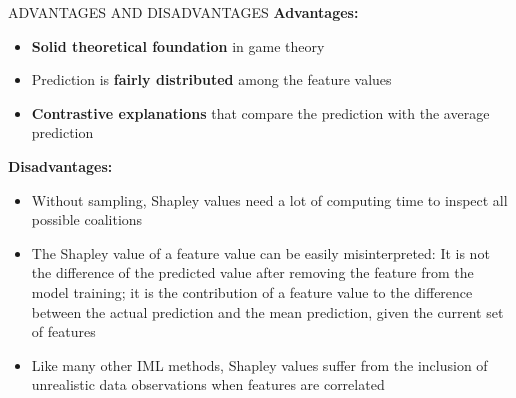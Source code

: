 \documentclass[11pt,compress,t,notes=noshow, aspectratio=169, xcolor=table]{beamer}
\begin{document}
\begin{frame}{ADVANTAGES AND DISADVANTAGES}
	\textbf{Advantages:}
	\begin{itemize}
	 \item \textbf{Solid theoretical foundation} in game theory
        \item Prediction is \textbf{fairly distributed} among the feature values
        \item \textbf{Contrastive explanations} that compare the prediction with the average prediction
	\end{itemize}
\vspace{0.25cm}
	\textbf{Disadvantages:}
	\begin{itemize}
		\item 	Without sampling, Shapley values need a lot of computing time to
		inspect all possible coalitions
		\item The Shapley value of a feature value can be easily misinterpreted:
		It is not the difference of the predicted value after removing the
		feature from the model training; it is the contribution of a feature
		value to the difference between the actual prediction and the mean
		prediction, given the current set of features
		\item Like many other IML methods, Shapley values suffer from the
		inclusion of unrealistic data observations when features are
		correlated
	\end{itemize}



\end{frame}

\endlecture
\end{document}
